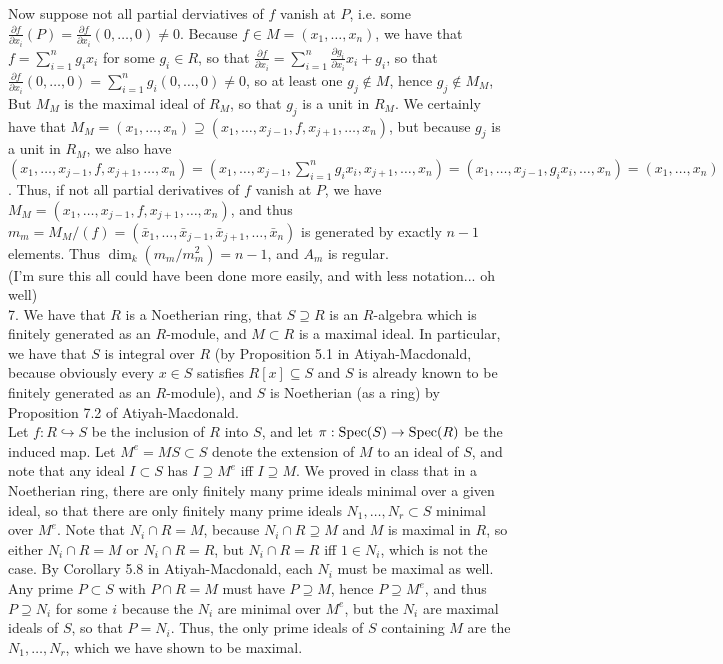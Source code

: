 \documentclass[11pt]{article}
\begin{document}
Now suppose not all partial derviatives of $f$ vanish at $P$, i.e. some
$\frac{\partial f}{\partial x_i}(P)=\frac{\partial f}{\partial
x_i}(0,\ldots,0)\neq0$. Because $f\in M=(x_1,\ldots,x_n)$, we
have that $f=\sum_{i=1}^n g_ix_i$ for some $g_i\in R$, so that
$\frac{\partial f}{\partial x_i}=\sum_{i=1}^n \frac{\partial
g_i}{\partial x_i}x_i + g_i$, so that $\frac{\partial f}{\partial
x_i}(0,\ldots,0)=\sum_{i=1}^n g_i(0,\ldots,0)\neq0$, so at least one
$g_j\notin M$, hence $g_j\notin M_M$, But $M_M$ is the maximal ideal
of $R_M$, so that $g_j$ is a unit in $R_M$. We certainly have that
$M_M=(x_1,\ldots,x_n)\supseteq (x_1,\ldots,x_{j-1},f,x_{j+1},\ldots,x_n)$,
but because $g_j$ is a unit in $R_M$, we also have
$(x_1,\ldots,x_{j-1},f,x_{j+1},\ldots,x_n)=(x_1,\ldots,x_{j-1},\sum_{i=1}^n
g_ix_i,x_{j+1},\ldots,x_n)=(x_1,\ldots,x_{j-1},g_ix_i,\ldots,x_n)=(x_1,\ldots,x_n)$.
Thus, if not all partial derivatives of $f$ vanish at $P$,
we have $M_M=(x_1,\ldots,x_{j-1},f,x_{j+1},\ldots,x_n)$, and thus
$m_m=M_M/(f)=(\bar{x}_1,\ldots,\bar{x}_{j-1},\bar{x}_{j+1},\ldots,\bar{x}_n)$
is generated by exactly $n-1$ elements. Thus $\dim_k(m_m/m_m^2)=n-1$, and
$A_m$ is regular. \\

(I'm sure this all could have been done more easily, and with less
notation... oh well)\\

\num{7.} We have that $R$ is a Noetherian ring, that $S\supseteq R$ is an
$R$-algebra which is finitely generated as an $R$-module, and $M\subset R$
is a maximal ideal. In particular, we have that $S$ is integral over $R$
(by Proposition 5.1 in Atiyah-Macdonald, because obviously every $x\in S$
satisfies $R[x]\subseteq S$ and $S$ is already known to be finitely generated
as an $R$-module), and $S$ is Noetherian (as a ring) by Proposition 7.2 of
Atiyah-Macdonald. \\

Let $f:R\hookrightarrow S$ be the inclusion of $R$ into $S$, and let
$\pi:\operatorname{Spec}(S)\rightarrow\operatorname{Spec}(R)$ be the induced map. Let $M^e=MS\subset
S$ denote the extension of $M$ to an ideal of $S$, and note that any ideal
$I\subset S$ has $I\supseteq M^e$ iff $I\supseteq M$. We proved in class that
in a Noetherian ring, there are only finitely many prime ideals minimal
over a given ideal, so that there are only finitely many prime ideals
$N_1,\ldots,N_r\subset S$ minimal over $M^e$. Note that $N_i\cap R=M$,
because $N_i\cap R\supseteq M$ and $M$ is maximal in $R$, so either $N_i\cap
R=M$ or $N_i\cap R=R$, but $N_i\cap R=R$ iff $1\in N_i$, which is not the
case. By Corollary 5.8 in Atiyah-Macdonald, each $N_i$ must be maximal as
well. Any prime $P\subset S$ with $P\cap R=M$ must have $P\supseteq M$,
hence $P\supseteq M^e$, and thus $P\supseteq N_i$ for some $i$ because the
$N_i$ are minimal over $M^e$, but the $N_i$ are maximal ideals of $S$, so
that  $P=N_i$. Thus, the only prime ideals of $S$ containing $M$ are the
$N_1,\ldots,N_r$, which we have shown to be maximal.\\
\end{document}
